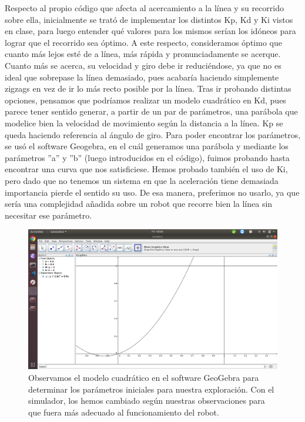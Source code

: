 \documentclass{article}
\begin{document}
Respecto al propio código que afecta al acercamiento a la línea y su recorrido sobre ella, inicialmente se trató de implementar los distintos Kp, Kd y Ki vistos en clase, para luego entender qué valores para los mismos serían los idóneos para lograr que el recorrido sea óptimo. A este respecto, consideramos óptimo que cuanto más lejos esté de a línea, más rápida y pronunciadamente se acerque. Cuanto más se acerca, su velocidad y giro debe ir reduciéndose, ya que no es ideal que sobrepase la línea demasiado, pues acabaría haciendo simplemente zigzags en vez de ir lo más recto posible por la línea. Tras ir probando distintas opciones, pensamos que podríamos realizar un modelo cuadrático en Kd, pues parece tener sentido generar, a partir de un par de parámetros, una parábola que modelice bien la velocidad de movimiento según la distancia a la línea. Kp se queda haciendo referencia al ángulo de giro. Para poder encontrar los parámetros, se usó el software Geogebra, en el cuál generamos una parábola y mediante los parámetros ''a'' y ''b'' (luego introducidos en el código), fuimos probando hasta encontrar una curva que nos satisficiese. Hemos probado también el uso de Ki, pero dado que no tenemos un sistema en que la aceleración tiene demasiada importancia pierde el sentido su uso. De esa manera, preferimos no usarlo, ya que sería una complejidad añadida sobre un robot que recorre bien la línea sin necesitar ese parámetro.


\begin{figure}[H]
    \centering
    \includegraphics[width=12cm]{modeloCuadratico.png}
    \caption{Observamos el modelo cuadrático en el software GeoGebra para determinar los parámetros iniciales para nuestra exploración. Con el simulador, los hemos cambiado según nuestras observaciones para que fuera más adecuado al funcionamiento del robot.}
    \label{fig:modeloCuadratico}
\end{figure}
\end{document}
